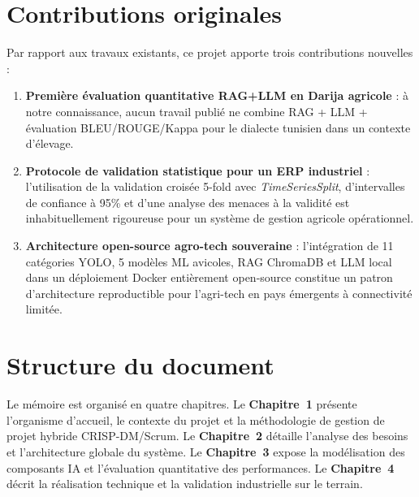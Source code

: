 \section*{Contributions originales}
Par rapport aux travaux existants, ce projet apporte trois contributions nouvelles :
\begin{enumerate}
  \item \textbf{Première évaluation quantitative RAG+LLM en Darija agricole} :
        à notre connaissance, aucun travail publié ne combine RAG + LLM + évaluation
        BLEU/ROUGE/Kappa pour le dialecte tunisien dans un contexte d'élevage.
  \item \textbf{Protocole de validation statistique pour un ERP industriel} :
        l'utilisation de la validation croisée 5-fold avec \textit{TimeSeriesSplit},
        d'intervalles de confiance à 95\% et d'une analyse des menaces à la validité
        est inhabituellement rigoureuse pour un système de gestion agricole opérationnel.
  \item \textbf{Architecture open-source agro-tech souveraine} : l'intégration de
        11 catégories YOLO, 5 modèles ML avicoles, RAG ChromaDB et LLM local dans
        un déploiement Docker entièrement open-source constitue un patron d'architecture
        reproductible pour l'agri-tech en pays émergents à connectivité limitée.
\end{enumerate}

\section*{Structure du document}
Le mémoire est organisé en quatre chapitres. Le \textbf{Chapitre~1} présente
l'organisme d'accueil, le contexte du projet et la méthodologie de gestion
de projet hybride CRISP-DM/Scrum. Le \textbf{Chapitre~2} détaille l'analyse
des besoins et l'architecture globale du système. Le \textbf{Chapitre~3}
expose la modélisation des composants IA et l'évaluation quantitative des
performances. Le \textbf{Chapitre~4} décrit la réalisation technique et
la validation industrielle sur le terrain.

